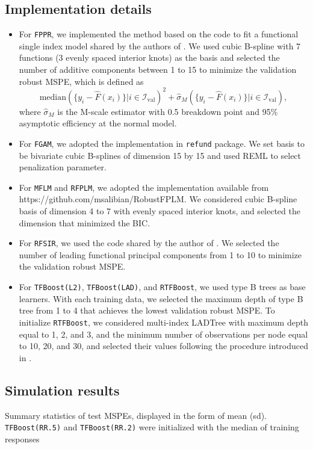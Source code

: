 \documentclass{article}
\begin{document}
\subsection{Implementation details}

\begin{itemize}
	\item For \texttt{FPPR}, we implemented the method based on the code to fit a functional single index model shared by  the authors of \cite{ferraty2013functional}.  We used cubic B-spline with 7 functions (3 evenly spaced interior knots) as the basis and selected the number of additive components between 1 to 15 to minimize the validation  robust  MSPE, which is defined as
	$$\text{median}( \{y_i - \hat{F}(x_i)\}|i \in \mathcal{I}_{\text{val}})^2 + \hat{\sigma}_M(  \{y_i - \hat{F}(x_i)\}|i \in \mathcal{I}_{\text{val}}),$$
	where $\hat{\sigma}_M$ is the M-scale estimator with 0.5 breakdown point and 95\% asymptotic efficiency at the normal model. 
	\item For \texttt{FGAM},  we adopted the implementation in \texttt{refund} package. We set basis to be bivariate cubic B-splines of dimension 15 by 15 and used REML to select penalization parameter. 
	\item For \texttt{MFLM} and \texttt{RFPLM}, we adopted the implementation available from \\ https://github.com/msalibian/RobustFPLM. We considered cubic B-spline basis of dimension 4 to 7 with evenly spaced interior knots, and selected the dimension that minimized the BIC. 
	\item For \texttt{RFSIR}, we used the code shared by the author of \cite{wang2017robust}. We selected the number of leading functional principal components from 1 to 10 to minimize the validation  robust  MSPE. 
	\item For \texttt{TFBoost(L2)},  \texttt{TFBoost(LAD)}, and  \texttt{RTFBoost}, we used type B trees as base learners. With each training data, we selected the maximum depth of type B tree from 1 to 4 that achieves the lowest validation robust MSPE. To initialize \texttt{RTFBoost}, we considered multi-index LADTree with  maximum depth equal to 1, 2, and 3, and the minimum number of observations per node equal to 10, 20, and 30, and selected their values following the procedure introduced in . 
\end{itemize}



\subsection{Simulation results}
Summary statistics of test MSPEs, displayed in the form of mean (sd). 
\texttt{TFBoost(RR.5)} and \texttt{TFBoost(RR.2)} were initialized with the median of training responses




\end{document}
